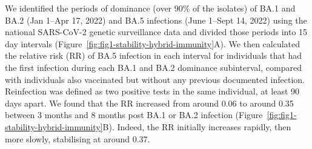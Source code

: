 We identified the periods of dominance (over 90\% of the isolates) of BA.1 and BA.2 (Jan 1--Apr 17, 2022) and BA.5 infections (June 1--Sept 14, 2022) using the national SARS-CoV-2 genetic surveillance data and divided those periods into 15 day intervals (Figure~\ref{fig:fig1-stability-hybrid-immunity}A). We then calculated the relative risk (RR) of BA.5 infection in each interval for individuals that had the first infection during each BA.1 and BA.2 dominance subinterval, compared with individuals also vaccinated but without any previous documented infection. Reinfection was defined as two positive tests in the same individual, at least 90 days apart. We found that the RR increased from around 0.06 to around 0.35 between 3 months and 8 months post BA.1 or BA.2 infection (Figure~\ref{fig:fig1-stability-hybrid-immunity}B). Indeed, the RR initially increases rapidly, then more slowly, stabilising at around 0.37.


